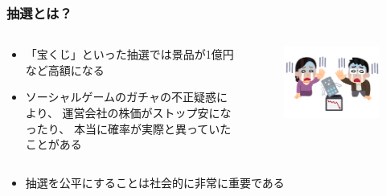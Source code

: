 \begin{frame}
  \frametitle{抽選とは？}

  \begin{columns}
    \begin{column}{0.8\textwidth}
      \begin{itemize}
        \item 「宝くじ」といった抽選では景品が1億円など高額になる
        \item ソーシャルゲームのガチャの不正疑惑により、
        運営会社の株価がストップ安になったり、
        本当に確率が実際と異っていたことがある
      \end{itemize}
    \end{column}
    \begin{column}{0.2\textwidth}
      \begin{center}
        \begin{figure}[h]
          \includegraphics[width=\textwidth]{img/toushika_kabunushi_shock.png}
        \end{figure}
      \end{center}
    \end{column}
  \end{columns}

  \pause
  \begin{center}
  \end{center}

  \pause
  \begin{itemize}
    \item 抽選を公平にすることは社会的に非常に重要である
  \end{itemize}
\end{frame}

